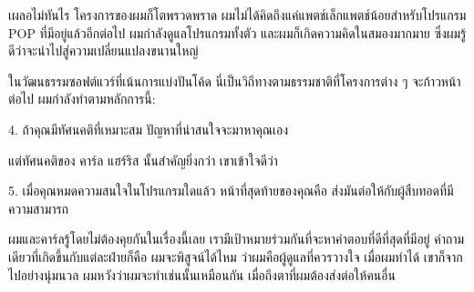 เผลอไม่ทันไร โครงการของผมก็โตพรวดพราด
ผมไม่ได้คิดถึงแค่แพตช์เล็กแพตช์น้อยสำหรับโปรแกรม POP
ที่มีอยู่แล้วอีกต่อไป ผมกำลังดูแลโปรแกรมทั้งตัว
และผมก็เกิดความคิดในสมองมากมาย
ซึ่งผมรู้ดีว่าจะนำไปสู่ความเปลี่ยนแปลงขนานใหญ่

ในวัฒนธรรมซอฟต์แวร์ที่เน้นการแบ่งปันโค้ด
นี่เป็นวิถีทางตามธรรมชาติที่โครงการต่าง ๆ  จะก้าวหน้าต่อไป
ผมกำลังทำตามหลักการนี้:

\begin{fancyquotes}
  4. ถ้าคุณมีทัศนคติที่เหมาะสม ปัญหาที่น่าสนใจจะมาหาคุณเอง
\end{fancyquotes}

แต่ทัศนคติของ คาร์ล แฮร์ริส นั้นสำคัญยิ่งกว่า เขาเข้าใจดีว่า

\begin{fancyquotes}
  5. เมื่อคุณหมดความสนใจในโปรแกรมใดแล้ว หน้าที่สุดท้ายของคุณคือ
  ส่งมันต่อให้กับผู้สืบทอดที่มีความสามารถ
\end{fancyquotes}

ผมและคาร์ลรู้โดยไม่ต้องคุยกันในเรื่องนี้เลย
เรามีเป้าหมายร่วมกันที่จะหาคำตอบที่ดีที่สุดที่มีอยู่
คำถามเดียวที่เกิดขึ้นกับแต่ละฝ่ายก็คือ ผมจะพิสูจน์ได้ไหม
ว่าผมคือผู้ดูแลที่ควรวางใจ เมื่อผมทำได้ เขาก็จากไปอย่างนุ่มนวล
ผมหวังว่าผมจะทำเช่นนั้นเหมือนกัน เมื่อถึงตาที่ผมต้องส่งต่อให้คนอื่น